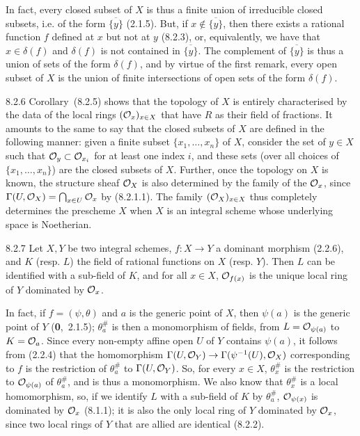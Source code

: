 \documentclass[../main.tex]{subfiles}
\begin{document}
In fact, every closed subset of $X$ is thus a finite union of irreducible closed subsets, i.e. of the form $\overline{\{y\}}$ (2.1.5).
But, if $x\not\in\overline{\{y\}}$, then there exists a rational function $f$ defined at $x$ but not at $y$ (8.2.3), or, equivalently, we have that $x\in\delta(f)$ and $\delta(f)$ is not contained in $\overline{\{y\}}$.
The complement  of $\overline{\{y\}}$ is thus a union of sets of the form $\delta(f)$, and by virtue of the first remark, every open subset of $X$ is the union of finite intersections of open sets of the form $\delta(f)$.

\begin{cx}{8.2.6}
    Corollary~(8.2.5) shows that the topology of $X$ is entirely characterised by the data of the local rings $(\mathcal{O}_x)_{x\in X}$ that have $R$ as their field of fractions.
    It amounts to the same to say that the closed subsets of $X$ are defined in the following manner: given a finite subset $\{x_1,\ldots,x_n\}$ of $X$, consider the set of $y\in X$ such that $\mathcal{O}_y\subset\mathcal{O}_{x_i}$ for at least one index $i$, and these sets (over all choices of $\{x_1,\ldots,x_n\}$) are the closed subsets of $X$.
    Further, once the topology on $X$ is known, the structure sheaf $\mathcal{O}_X$ is also determined by the family of the $\mathcal{O}_x$, since $\Gamma(U,\mathcal{O}_X)=\bigcap_{x\in U}\mathcal{O}_x$ by (8.2.1.1).
    The family $(\mathcal{O}_X)_{x\in X}$ thus completely determines the prescheme $X$ when $X$ is an integral scheme whose underlying space is Noetherian.
\end{cx}

\begin{cx}[Proposition]{8.2.7}
    Let $X,Y$ be two integral schemes, $f\colon X\to Y$ a dominant morphism (2.2.6), and $K$ (resp. $L$) the field of rational functions on $X$ (resp. $Y$).
    Then $L$ can be identified with a sub-field of $K$, and for all $x\in X$, $\mathcal{O}_{f(x)}$ is the unique local ring of $Y$ dominated by $\mathcal{O}_x$.
\end{cx}

In fact, if $f=(\psi,\theta)$ and $a$ is the generic point of $X$, then $\psi(a)$ is the generic point of $Y$ (\textbf{0},~2.1.5); $\theta_a^\#$ is then a monomorphism of fields, from $L=\mathcal{O}_{\psi(a)}$ to $K=\mathcal{O}_a$.
Since every non-empty affine open $U$ of $Y$ contains $\psi(a)$, it follows from (2.2.4) that the homomorphism $\Gamma(U,\mathcal{O}_Y)\to\Gamma(\psi^{-1}(U),\mathcal{O}_X)$ corresponding to $f$ is the restriction of $\theta_a^\#$ to $\Gamma(U,\mathcal{O}_Y)$.
So, for every $x\in X$, $\theta_x^\#$ is the restriction to $\mathcal{O}_{\psi(a)}$ of $\theta_a^\#$, and is thus a monomorphism.
We also know that $\theta_x^\#$ is a local homomorphism, so, if we identify $L$ with a sub-field of $K$ by $\theta_a^\#$, $\mathcal{O}_{\psi(x)}$ is dominated by $\mathcal{O}_x$ (8.1.1); it is also the only local ring of $Y$ dominated by $\mathcal{O}_x$, since two local rings of $Y$ that are allied are identical (8.2.2).
\end{document}
